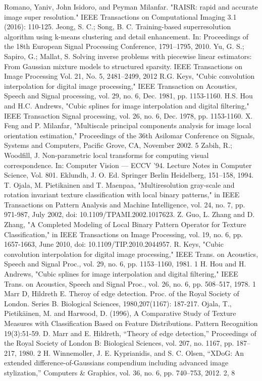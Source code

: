 \documentclass[12pt, a4paper, oneside]{ctexbook}
\begin{document}
	\newpage
	\begin{thebibliography}{99}
		Romano, Yaniv, John Isidoro, and Peyman Milanfar. "RAISR: rapid and accurate image super resolution." IEEE Transactions on Computational Imaging 3.1 (2016): 110-125.
		Jeong, S. C.; Song, B. C. Training-based superresolution algorithm using k-means clustering and detail enhancement. In: Proceedings of the 18th European Signal Processing Conference, 1791–1795, 2010.
		 Yu, G. S.; Sapiro, G.; Mallat, S. Solving inverse problems with piecewise linear estimators: From Gaussian mixture models to structured sparsity. IEEE Transactions on Image Processing Vol. 21, No. 5, 2481–2499, 2012
		R.G. Keys, "Cubic convolution interpolation for digital image processing," IEEE Transaction on Acoustics, Speech and Signal processing, vol. 29, no. 6, Dec. 1981, pp. 1153-1160.
		H.S. Hou and H.C. Andrews, "Cubic splines for image interpolation and digital filtering," IEEE Transaction Signal processing, vol. 26, no. 6, Dec. 1978, pp. 1153-1160.
		X. Feng and P. Milanfar, "Multiscale principal components analysis for image local orientation estimation," Proceedings of the 36th Asilomar Conference on Signals, Systems and Computers, Pacific Grove, CA, November 2002. 5
		Zabih, R.; Woodfill, J. Non-parametric local transforms for computing visual correspondence. In: Computer Vision — ECCV '94. Lecture Notes in Computer Science, Vol. 801. Eklundh, J. O. Ed. Springer Berlin Heidelberg, 151–158, 1994.
		T. Ojala, M. Pietikainen and T. Maenpaa, "Multiresolution gray-scale and rotation invariant texture classification with local binary patterns," in IEEE Transactions on Pattern Analysis and Machine Intelligence, vol. 24, no. 7, pp. 971-987, July 2002, doi: 10.1109/TPAMI.2002.1017623.
		Z. Guo, L. Zhang and D. Zhang, "A Completed Modeling of Local Binary Pattern Operator for Texture Classification," in IEEE Transactions on Image Processing, vol. 19, no. 6, pp. 1657-1663, June 2010, doi: 10.1109/TIP.2010.2044957.
		 R. Keys, "Cubic convolution interpolation for digital image processing," IEEE Trans. on Acoustics, Speech and Signal Proc., vol. 29, no. 6, pp. 1153–1160, 1981. 1
		H. Hou and H. Andrews, "Cubic splines for image interpolation and digital filtering," IEEE Trans. on Acoustics, Speech and Signal Proc., vol. 26, no. 6, pp. 508–517, 1978. 1
		Marr D, Hildreth E. Theroy of edge detection. Proc. of the Royal Society of London. Series B. Biological Sciences, 1980,207(1167): 187-217.
		Ojala, T., Pietikäinen, M. and Harwood, D. (1996), A Comparative Study of Texture Measures with Classification Based on Feature Distributions. Pattern Recognition 19(3):51-59.
		D. Marr and E. Hildreth, “Theory of edge detection,” Proceedings of the Royal Society of London B: Biological Sciences, vol. 207, no. 1167, pp. 187–217, 1980. 2		
		H. Winnemoller, J. E. Kyprianidis, and S. C. Olsen, “XDoG: An extended difference-of-Gaussians compendium including advanced image stylization,” Computers & Graphics, vol. 36, no. 6, pp. 740–753, 2012. 2, 8
	\end{thebibliography}
	
	
\end{document}
